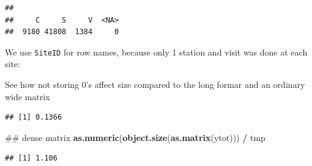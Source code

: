 \documentclass[12pt,]{book}
\newenvironment{Shaded}{\begin{snugshade}}{\end{snugshade}}
\newcommand{\KeywordTok}[1]{\textcolor[rgb]{0.13,0.29,0.53}{\textbf{#1}}}
\newcommand{\NormalTok}[1]{#1}
\newcommand{\OperatorTok}[1]{\textcolor[rgb]{0.81,0.36,0.00}{\textbf{#1}}}
\newcommand{\StringTok}[1]{\textcolor[rgb]{0.31,0.60,0.02}{#1}}
\begin{document}
\begin{verbatim}
## 
##     C     S     V  <NA> 
##  9180 41808  1384     0
\end{verbatim}

We use \texttt{SiteID} for row names, because only 1 station and visit was done at each site:

\begin{Shaded}
\end{Shaded}

See how not storing 0's affect size compared to the long formar and an ordinary wide matrix

\begin{Shaded}
\end{Shaded}

\begin{verbatim}
## [1] 0.1366
\end{verbatim}

\begin{Shaded}
\begin{Highlighting}[]
\NormalTok{## dense matrix}
\KeywordTok{as.numeric}\NormalTok{(}\KeywordTok{object.size}\NormalTok{(}\KeywordTok{as.matrix}\NormalTok{(ytot))) }\OperatorTok{/}\StringTok{ }\NormalTok{tmp}
\end{Highlighting}
\end{Shaded}

\begin{verbatim}
## [1] 1.106
\end{verbatim}
\end{document}
